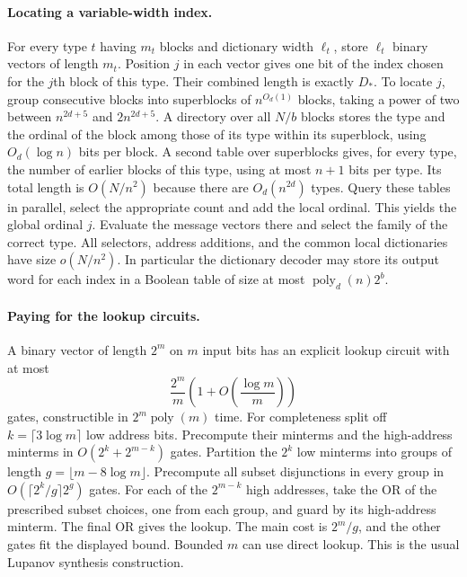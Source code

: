 \paragraph{Locating a variable-width index.}
For every type $t$ having $m_t$ blocks and dictionary width $\ell_t$, store $\ell_t$ binary vectors of length $m_t$. Position $j$ in each vector gives one bit of the index chosen for the $j$th block of this type. Their combined length is exactly $D_*$. To locate $j$, group consecutive blocks into superblocks of $n^{O_d(1)}$ blocks, taking a power of two between $n^{2d+5}$ and $2n^{2d+5}$. A directory over all $N/b$ blocks stores the type and the ordinal of the block among those of its type within its superblock, using $O_d(\log n)$ bits per block. A second table over superblocks gives, for every type, the number of earlier blocks of this type, using at most $n+1$ bits per type. Its total length is $O(N/n^2)$ because there are $O_d(n^{2d})$ types. Query these tables in parallel, select the appropriate count and add the local ordinal. This yields the global ordinal $j$. Evaluate the message vectors there and select the family of the correct type. All selectors, address additions, and the common local dictionaries have size $o(N/n^2)$. In particular the dictionary decoder may store its output word for each index in a Boolean table of size at most $\operatorname{poly}_d(n)2^b$.

\paragraph{Paying for the lookup circuits.}
A binary vector of length $2^m$ on $m$ input bits has an explicit lookup circuit with at most
\[
 \frac{2^m}{m}\left(1+O\!\left(\frac{\log m}{m}\right)\right)
\]
gates, constructible in $2^m\operatorname{poly}(m)$ time. For completeness split off $k=\lceil3\log m\rceil$ low address bits. Precompute their minterms and the high-address minterms in $O(2^k+2^{m-k})$ gates. Partition the $2^k$ low minterms into groups of length $g=\lfloor m-8\log m\rfloor$. Precompute all subset disjunctions in every group in $O(\lceil2^k/g\rceil 2^g)$ gates. For each of the $2^{m-k}$ high addresses, take the OR of the prescribed subset choices, one from each group, and guard by its high-address minterm. The final OR gives the lookup. The main cost is $2^m/g$, and the other gates fit the displayed bound. Bounded $m$ can use direct lookup. This is the usual Lupanov synthesis construction.

